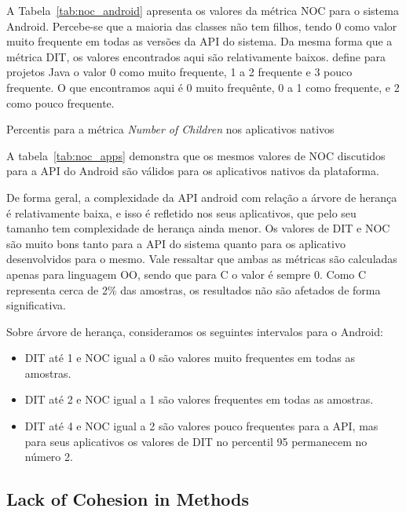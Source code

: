 A Tabela~\ref{tab:noc_android} apresenta os valores da métrica NOC para o sistema Android. Percebe-se que a maioria das classes não tem filhos, tendo 0 como valor muito frequente em todas as versões da API do sistema. Da mesma forma que a métrica DIT, os valores encontrados aqui são relativamente baixos.  define para projetos Java o valor 0 como muito frequente, 1 a 2 frequente e 3 pouco frequente. O que encontramos aqui é 0 muito frequênte, 0 a 1 como frequente, e 2 como pouco frequente.

\begin{table}[!htb]
\centering
{}

\caption{Percentis para a métrica \textit{Number of Children} nos aplicativos nativos}
\label{tab:noc_apps}
\end{table}

A tabela~\ref{tab:noc_apps} demonstra que os mesmos valores de NOC discutidos para a API do Android são válidos para os aplicativos nativos da plataforma. 

De forma geral, a complexidade da API android com relação a árvore de herança é relativamente baixa, e isso é refletido nos seus aplicativos, que pelo seu tamanho tem complexidade de herança ainda menor. Os valores de DIT e NOC são muito bons tanto para a API do sistema quanto para os aplicativo desenvolvidos para o mesmo. Vale ressaltar que ambas as métricas são calculadas apenas para linguagem OO, sendo que para C o valor é sempre 0. Como C representa cerca de 2\% das amostras, os resultados não são afetados de forma significativa.

Sobre árvore de herança, consideramos os seguintes intervalos para o Android:

\begin{itemize}
\item DIT até 1 e NOC igual a 0 são valores muito frequentes em todas as amostras.
\item DIT até 2 e NOC igual a 1 são valores frequentes em todas as amostras.
\item DIT até 4 e NOC igual a 2 são valores pouco frequentes para a API, mas para seus aplicativos os valores de DIT no percentil 95 permanecem no número 2.
\end{itemize}

\subsection{Lack of Cohesion in Methods}

